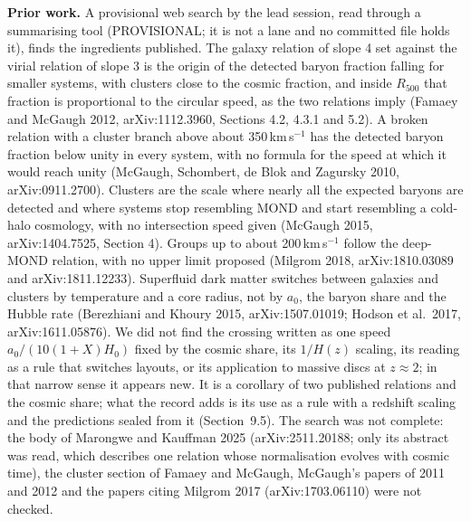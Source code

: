 \documentclass[10pt]{article}
\begin{document}
\textbf{Prior work.} A provisional web search by the lead session, read through a summarising tool (PROVISIONAL; it is not a lane and no committed file holds it), finds the ingredients published. The galaxy relation of slope 4 set against the virial relation of slope 3 is the origin of the detected baryon fraction falling for smaller systems, with clusters close to the cosmic fraction, and inside $R_{500}$ that fraction is proportional to the circular speed, as the two relations imply (Famaey and McGaugh 2012, arXiv:1112.3960, Sections 4.2, 4.3.1 and 5.2). A broken relation with a cluster branch above about 350\,km\,s$^{-1}$ has the detected baryon fraction below unity in every system, with no formula for the speed at which it would reach unity (McGaugh, Schombert, de Blok and Zagursky 2010, arXiv:0911.2700). Clusters are the scale where nearly all the expected baryons are detected and where systems stop resembling MOND and start resembling a cold-halo cosmology, with no intersection speed given (McGaugh 2015, arXiv:1404.7525, Section 4). Groups up to about 200\,km\,s$^{-1}$ follow the deep-MOND relation, with no upper limit proposed (Milgrom 2018, arXiv:1810.03089 and arXiv:1811.12233). Superfluid dark matter switches between galaxies and clusters by temperature and a core radius, not by $a_0$, the baryon share and the Hubble rate (Berezhiani and Khoury 2015, arXiv:1507.01019; Hodson et al.\ 2017, arXiv:1611.05876). We did not find the crossing written as one speed $a_0/(10(1+X)H_0)$ fixed by the cosmic share, its $1/H(z)$ scaling, its reading as a rule that switches layouts, or its application to massive discs at $z\approx2$; in that narrow sense it appears new. It is a corollary of two published relations and the cosmic share; what the record adds is its use as a rule with a redshift scaling and the predictions sealed from it (Section~9.5). The search was not complete: the body of Marongwe and Kauffman 2025 (arXiv:2511.20188; only its abstract was read, which describes one relation whose normalisation evolves with cosmic time), the cluster section of Famaey and McGaugh, McGaugh's papers of 2011 and 2012 and the papers citing Milgrom 2017 (arXiv:1703.06110) were not checked.
\end{document}
